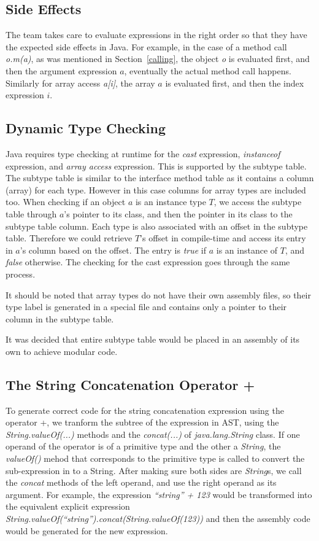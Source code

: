 \documentclass[a4paper, notitlepage]{report}
\begin{document}
\subsection{Side Effects}

The team takes care to evaluate expressions in the right order so that they have the expected side effects in Java. For example, in the case of a method call \emph{o.m(a)}, as was mentioned in Section~\ref{calling}, the object \emph{o} is evaluated first, and then the argument expression $a$, eventually the actual method call happens. Similarly for array access \emph{a[i]}, the array $a$ is evaluated first, and then the index expression $i$.

\subsection{Dynamic Type Checking}
\label{type_check}

Java requires type checking at runtime for the \emph{cast} expression, \emph{instanceof} expression, and \emph{array access} expression. This is supported by the subtype table. The subtype table is similar to the interface method table as it contains a column (array) for each type. However in this case columns for array types are included too. When checking if an object $a$ is an instance type $T$, we access the subtype table through $a$'s pointer to its class, and then the pointer in its class to the subtype table column. Each type is also associated with an offset in the subtype table. Therefore we could retrieve $T$'s offset in compile-time and access its entry in $a$'s column based on the offset. The entry is \emph{true} if $a$ is an instance of $T$, and \emph{false} otherwise. The checking for the cast expression goes through the same process.

It should be noted that array types do not have their own assembly files, so their type label is generated in a special file and contains only a pointer to their column in the subtype table.

It was decided that entire subtype table would be placed in an assembly of its own to achieve modular code.

\subsection{The String Concatenation Operator +}

To generate correct code for the string concatenation expression using the operator +, we tranform the subtree of the expression in AST, using the \emph{String.valueOf(...)} methods and the \emph{concat(...)} of \emph{java.lang.String} class. If one operand of the operator is of a primitive type and the other a \emph{String}, the \emph{valueOf()} mehod that corresponds to the primitive type is called to convert the sub-expression in to a String. After making sure both sides are \emph{String}s, we call the \emph{concat} methods of the left operand, and use the right operand as its argument. For example, the expression \emph{``string'' + 123} would be transformed into the equivalent explicit expression \emph{String.valueOf(``string'').concat(String.valueOf(123))} and then the assembly code would be generated for the new expression. 
\end{document}
